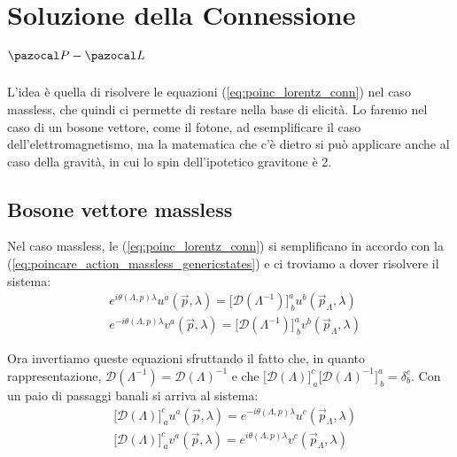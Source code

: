 \documentclass[../main.tex]{subfiles}
\begin{document}
\section{Soluzione della Connessione $\pazocal P-\pazocal L$}

L'idea è quella di risolvere le equazioni (\ref{eq:poinc_lorentz_conn}) nel caso massless, che quindi ci permette di restare nella base di elicità. Lo faremo nel caso di un bosone vettore, come il fotone, ad esemplificare il caso dell'elettromagnetismo, ma la matematica che c'è dietro si può applicare anche al caso della gravità, in cui lo spin dell'ipotetico gravitone è 2.

\subsection{Bosone vettore massless}
Nel caso massless, le (\ref{eq:poinc_lorentz_conn}) si semplificano in accordo con la (\ref{eq:poincare_action_massless_genericstates}) e ci troviamo a dover risolvere il sistema:
\begin{equation}
    \begin{aligned}
        &e^{i\theta(\Lambda, p)\lambda} u^a(\Vec{p},\lambda) = 
        \big[\mathscr D(\Lambda^{-1})\big]^a_{~b}u^b(\Vec{p}_\Lambda,\lambda)\\
        &e^{-i\theta(\Lambda, p)\lambda} v^a(\Vec{p},\lambda) = \big[\mathscr D(\Lambda^{-1})\big]^a_{~b}v^b(\Vec{p}_\Lambda,\lambda)
    \end{aligned}
    \label{eq:poinc_lorentz_conn_massless}
\end{equation}

Ora invertiamo queste equazioni sfruttando il fatto che, in quanto rappresentazione, $\mathscr D(\Lambda^{-1}) = \mathscr D(\Lambda)^{-1}$ e che $\big[\mathscr D(\Lambda)\big]^c_{~a}\big[\mathscr D(\Lambda)^{-1}\big]^a_{~b} = \delta^c_b$. Con un paio di passaggi banali si arriva al sistema:
\begin{equation}
    \begin{aligned}
        &\big[\mathscr D(\Lambda)\big]^c_{~a} u^a(\Vec{p},\lambda) = 
        e^{-i\theta(\Lambda, p)\lambda}u^c(\Vec{p}_\Lambda,\lambda)\\
        &\big[\mathscr D(\Lambda)\big]^c_{~a} v^a(\Vec{p},\lambda) = e^{i\theta(\Lambda, p)\lambda}v^c(\Vec{p}_\Lambda,\lambda)
    \end{aligned}
    \label{eq:poinc_lorentz_conn_massless_inverted}
\end{equation}
\end{document}
